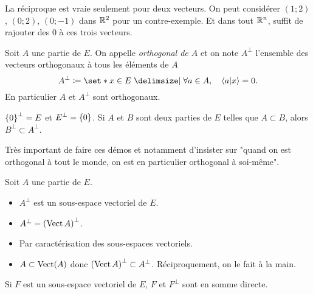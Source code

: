 \documentclass{magnolia}
\begin{document}
\begin{sol}
La réciproque est vraie seulement pour deux vecteurs. On peut considérer $(1;2)$, $(0;2)$, $(0;-1)$ dans $\mathbb{R}^2$ pour un contre-exemple. Et dans tout $\mathbb{R}^n$, suffit de rajouter des $0$ à ces trois vecteurs.
\end{sol}

\begin{definition}[utile=-3]
Soit $A$ une partie de $E$. On appelle \emph{orthogonal de $A$} et on note $A^{\perp}$
l'ensemble des vecteurs orthogonaux à tous les éléments de $A$
\[A^{\perp}\defeq\enstq{x\in E}{\forall a\in A \qsep \ps{a}{x}=0}.\]  
En particulier $A$ et $A^\perp$ sont orthogonaux.
\end{definition}

\begin{remarques}
\remarque $\left\{0\right\}^\perp=E$ et $E^\perp=\left\{0\right\}$.
\remarque Si $A$ et $B$ sont deux parties de $E$ telles que $A\subset B$, alors
  $B^\perp\subset A^\perp$.
\end{remarques}

\begin{sol}
Très important de faire ces démos et notamment d'insister sur "quand on est orthogonal à tout le monde, on est en particulier orthogonal à soi-même".
\end{sol}

\begin{proposition}[utile=-3]
Soit $A$ une partie de $E$.
\begin{itemize}
\item $A^{\perp}$ est un sous-espace vectoriel de $E$.
\item $A^{\perp}=\left(\operatorname{Vect} A\right)^{\perp}$.
\end{itemize}
\end{proposition}

\begin{preuve}
\begin{itemize}
\item Par caractérisation des sous-espaces vectoriels.
\item $A\subset \operatorname{Vect}(A)$ donc $\left(\operatorname{Vect} A\right)^{\perp}\subset A^{\perp}$. Réciproquement, on le fait à la main.
\end{itemize}
\end{preuve}

\begin{remarqueUnique}
\remarque Si $F$ est un sous-espace vectoriel de $E$, $F$ et $F^\perp$ sont en
  somme directe.
\end{remarqueUnique}
\end{document}
